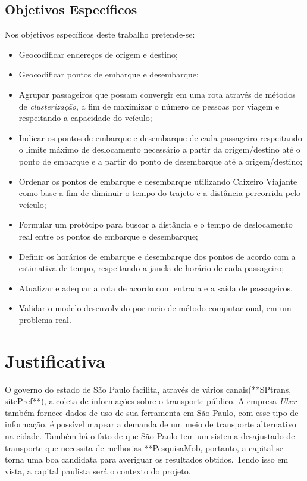 \subsection{Objetivos Específicos}
Nos objetivos específicos deste trabalho pretende-se:
\begin{itemize}
    \item Geocodificar endereços de origem e destino;
    
    \item Geocodificar pontos de embarque e desembarque;
    
    \item Agrupar passageiros que possam convergir em uma rota através de métodos de \emph{clusterização}, a fim de maximizar o número de pessoas por viagem e respeitando a capacidade do veículo;
    
    \item Indicar os pontos de embarque e desembarque de cada passageiro respeitando o limite máximo de deslocamento necessário a partir da origem/destino até o ponto de embarque e a partir do ponto de desembarque até a origem/destino;
    
    \item Ordenar os pontos de embarque e desembarque utilizando Caixeiro Viajante como base a fim de diminuir o tempo do trajeto e a distância percorrida pelo veículo;
    
    \item Formular um protótipo para buscar a distância e o tempo de deslocamento real entre os pontos de embarque e desembarque;
    
    \item Definir os horários de embarque e desembarque dos pontos de acordo com a estimativa de tempo, respeitando a janela de horário de cada passageiro;
    
    \item Atualizar e adequar a rota de acordo com entrada e a saída de passageiros.
    
    \item Validar o modelo desenvolvido por meio de método computacional, em um problema real.
    
\end{itemize}

\section{Justificativa}
O governo do estado de São Paulo facilita, através de vários canais(**SPtrans, sitePref**), a coleta de informações sobre o transporte público. A empresa \emph{Uber} também fornece dados de uso de sua ferramenta em São Paulo, com esse tipo de informação, é possível mapear a demanda de um meio de transporte alternativo na cidade. Também há o fato de que São Paulo tem um sistema desajustado de transporte que necessita de melhorias **PesquisaMob, portanto, a capital se torna uma boa candidata para averiguar os resultados obtidos. Tendo isso em vista, a capital paulista será o contexto do projeto.

